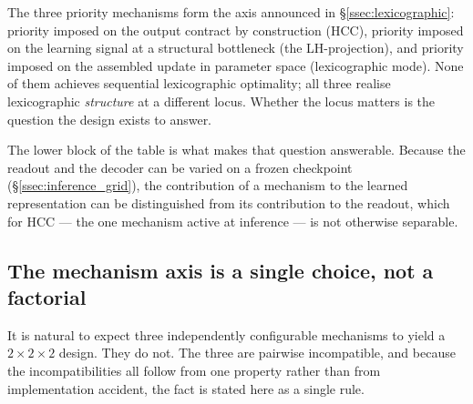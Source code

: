 The three priority mechanisms form the axis announced in
\S\ref{ssec:lexicographic}: priority imposed on the output contract by
construction (HCC), priority imposed on the learning signal at a structural
bottleneck (the LH-projection), and priority imposed on the assembled update in
parameter space (lexicographic mode). None of them achieves sequential
lexicographic optimality; all three realise lexicographic \emph{structure} at a
different locus. Whether the locus matters is the question the design exists to
answer.

The lower block of the table is what makes that question answerable. Because the
readout and the decoder can be varied on a frozen checkpoint
(\S\ref{ssec:inference_grid}), the contribution of a mechanism to the learned
representation can be distinguished from its contribution to the readout, which
for HCC --- the one mechanism active at inference --- is not otherwise separable.

\subsection{The mechanism axis is a single choice, not a factorial}
\label{ssec:design_axis}

It is natural to expect three independently configurable mechanisms to yield a
$2\times2\times2$ design. They do not. The three are pairwise incompatible, and
because the incompatibilities all follow from one property rather than from
implementation accident, the fact is stated here as a single rule.


